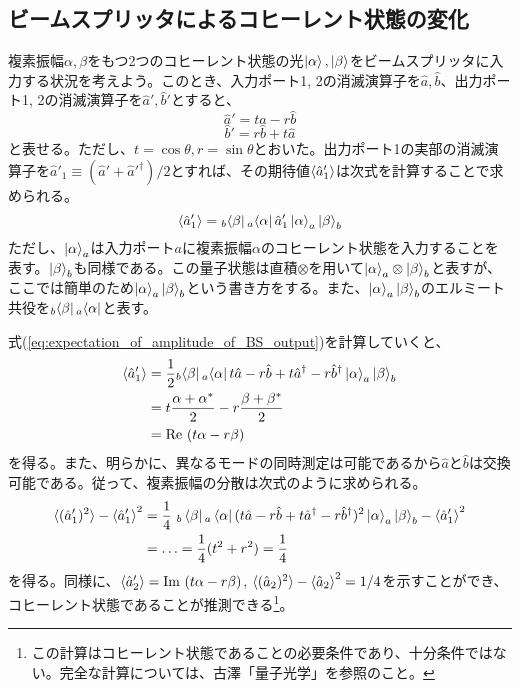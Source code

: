 \subsection{ビームスプリッタによるコヒーレント状態の変化}
複素振幅$\alpha, \beta$をもつ2つのコヒーレント状態の光$\ket \alpha, \ket \beta$をビームスプリッタに入力する状況を考えよう。このとき、入力ポート1, 2の消滅演算子を$\hat a, \hat b$、出力ポート1, 2の消滅演算子を$\hat a', \hat b'$とすると、
\begin{equation}
  \hat a' = t\hat a - r \hat b
\end{equation}
\begin{equation}
  \hat b' = r\hat b + t \hat a
\end{equation}
と表せる。ただし、$t = \cos \theta, r = \sin \theta $とおいた。出力ポート1の実部の消滅演算子を$\hat a'_1 \equiv (\hat a' + \hat a'^\dagger)/2$とすれば、その期待値$\braket{\hat a'_1}$は次式を計算することで求められる。
\begin{equation}
  \braket{\hat a'_1} = {}_b\!\bra{\beta}{}_a\!\bra{\alpha}\hat a'_1\ket{\alpha}_a \ket {\beta}_b
  \label{eq:expectation_of_amplitude_of_BS_output}
\end{equation}
ただし、$\ket \alpha_a$は入力ポート$a$に複素振幅$\alpha$のコヒーレント状態を入力することを表す。$\ket \beta_b$も同様である。この量子状態は直積$\otimes$を用いて$\ket \alpha_a \otimes \ket \beta _ b$と表すが、ここでは簡単のため$\ket \alpha_a \ket \beta _b$という書き方をする。また、$\ket \alpha_a \ket \beta _b$のエルミート共役を${}_b\!\bra{\beta}{}_a\!\bra{\alpha}$と表す。

式(\ref{eq:expectation_of_amplitude_of_BS_output})を計算していくと、
\begin{equation}
  \begin{aligned}
  	\braket{\hat a'_1} &= \frac 1 2 {}_b\!\bra{\beta}{}_a\!\bra{\alpha} t \hat a - r\hat b + t \hat a^\dagger - r \hat b^\dagger\ket \alpha _ a \ket \beta _ b \\
  	&=  t\frac{\alpha + \alpha^*}{2} - r \frac{\beta + \beta ^*}{2} \\
  	&= \mathrm {Re} \ (t\alpha - r \beta)
  \end{aligned}
\end{equation}
を得る。また、明らかに、異なるモードの同時測定は可能であるから$\hat a$と$\hat b$は交換可能である。従って、複素振幅の分散は次式のように求められる。
\begin{equation}
\begin{aligned}
  \braket{(\hat a'_1)^2} - \braket{\hat a'_1}^2 &= \frac 1 4 \  {}_b\bra{\beta}{}_a\bra{\alpha} (t \hat a - r\hat b + t \hat a^\dagger - r \hat b^\dagger)^2 \ket \alpha _ a \ket \beta _ b  - \braket{\hat a'_1}^2\\
  &=\hdots = \frac 1 4 (t^2 + r^2) = \frac 1 4
  \label{eq:variance_of_amplitude_of_BS_output}
\end{aligned}
\end{equation}
を得る。同様に、$\braket{\hat a'_2} = \mathrm {Im} \ (t\alpha - r\beta)$, $\braket{(\hat a_2)^2} - \braket{\hat a_2}^2 = 1/4$を示すことができ、コヒーレント状態であることが推測できる\footnote{この計算はコヒーレント状態であることの必要条件であり、十分条件ではない。完全な計算については、古澤「量子光学」を参照のこと。}。

